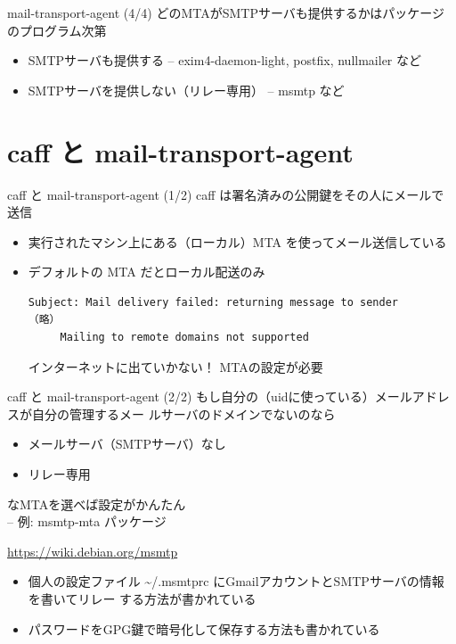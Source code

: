 \begin{frame}[containsverbatim]{mail-transport-agent (4/4)}
どのMTAがSMTPサーバも提供するかはパッケージのプログラム次第

 \begin{itemize}
  \item SMTPサーバも提供する -- exim4-daemon-light, postfix, nullmailer
	など
  \item SMTPサーバを提供しない（リレー専用） -- msmtp など
 \end{itemize}
\end{frame}

\section{caff と mail-transport-agent}
\begin{frame}[containsverbatim]{caff と mail-transport-agent (1/2)}
caff は署名済みの公開鍵をその人にメールで送信 

 \begin{itemize}
  \item 実行されたマシン上にある（ローカル）MTA を使ってメール送信している
  \item デフォルトの MTA だとローカル配送のみ
 \footnotesize
\begin{verbatim}
Subject: Mail delivery failed: returning message to sender
（略）
	 Mailing to remote domains not supported
\end{verbatim}
 \normalsize
	インターネットに出ていかない！ MTAの設定が必要
 \end{itemize}

\end{frame}

\begin{frame}{caff と mail-transport-agent (2/2)}
        もし自分の（uidに使っている）メールアドレスが自分の管理するメー
       ルサーバのドメインでないのなら

 \begin{itemize}
  \item メールサーバ（SMTPサーバ）なし
  \item リレー専用
 \end{itemize}

       なMTAを選べば設定がかんたん\\
       -- 例: msmtp-mta パッケージ

\pause
 \url{https://wiki.debian.org/msmtp}

 \begin{itemize}
  \item  個人の設定ファイル \textasciitilde/.msmtprc にGmailアカウントとSMTPサーバの情報を書いてリレー
 する方法が書かれている
  \item  パスワードをGPG鍵で暗号化して保存する方法も書かれている
 \end{itemize}
\end{frame}


